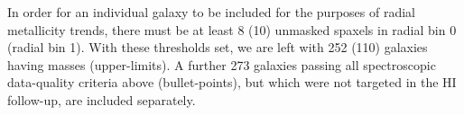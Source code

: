 In order for an individual galaxy to be included for the purposes of radial metallicity trends, there must be at least 8 (10) unmasked spaxels in radial bin 0 (radial bin 1). With these thresholds set, we are left with 252 (110) galaxies having \hi masses (upper-limits). A further 273 galaxies passing all spectroscopic data-quality criteria above (bullet-points), but which were not targeted in the HI follow-up, are included separately.